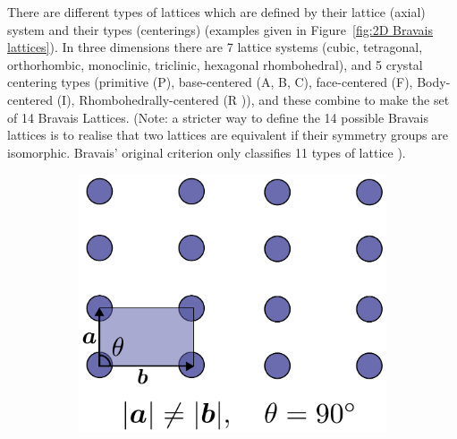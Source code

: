         There are different types of lattices which are defined by their lattice (axial) system and their types (centerings) (examples given in Figure~\ref{fig:2D Bravais lattices}).
        In three dimensions there are 7 lattice systems (cubic, tetragonal, orthorhombic, monoclinic, triclinic, hexagonal rhombohedral), and 5 crystal centering types (primitive (P), base-centered (A, B, C), face-centered (F), Body-centered (I), Rhombohedrally-centered (R )), and these combine to make the set of 14 Bravais Lattices.
        (Note: a stricter way to define the 14 possible Bravais lattices is to realise that two lattices are equivalent if their symmetry groups are isomorphic.
        Bravais' original criterion only classifies 11 types of lattice \cite{pitteri1996definition}).
        \begin{figure}
            \centering
            \begin{subfigure}[b]{0.45\textwidth}
                    \centering
                    \includegraphics[width=\textwidth]{figures/introduction/rectangularbravaislattice.pdf}
                    \caption{}
                    \label{fig:2D rectangular Bravais lattice}
            \end{subfigure}
            \qquad
            \begin{subfigure}[b]{0.45\textwidth}
                    \centering

\end{subfigure}
\end{figure}
